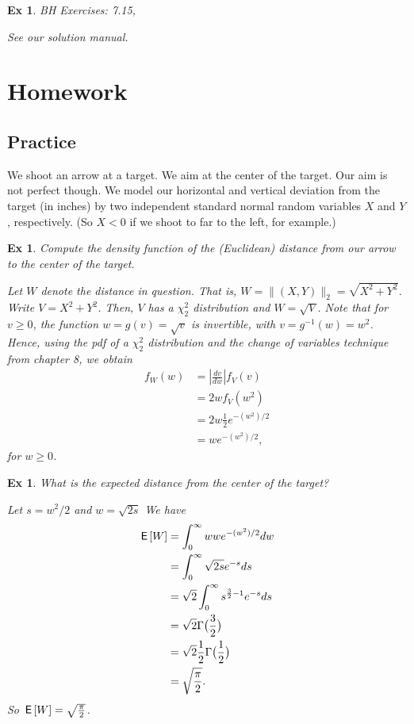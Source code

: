 \documentclass[a4paper,11pt]{article}
\newtheorem{exercise}[theorem]{Ex}
\begin{document}
\begin{exercise}
BH Exercises: 7.15,
\begin{solution}
See our solution manual.
\end{solution}
\end{exercise}


\section{Homework}
\label{sec:homework}

\subsection{Practice}
\label{sec:practice}

We shoot an arrow at a target. We aim at the center of the target. Our aim is not perfect though. We model our horizontal and vertical deviation from the target (in inches) by two independent standard normal random variables $X$ and $Y$, respectively. (So $X<0$ if we shoot to far to the left, for example.)

\begin{exercise}
Compute the density function of the (Euclidean) distance from our arrow to the center of the target. %
\begin{solution}
Let $W$ denote the distance in question. That is, $W = \| (X,Y) \|_2 = \sqrt{X^2 + Y^2}$. Write $V = X^2 + Y^2$. Then, $V$ has a $\chi^2_2$ distribution and $W = \sqrt{V}$. Note that for $v \geq 0$, the function $w = g(v) = \sqrt{v}$ is invertible, with $v = g^{-1}(w) = w^2$. Hence, using the pdf of a $\chi^2_2$ distribution and the change of variables technique from chapter 8, we obtain
\begin{align}
    f_W(w) &=  |\frac{dv}{dw}| f_V(v) \\
    &= 2w f_V(w^2) \\
    &= 2w \frac{1}{2} e^{-(w^2)/2} \\
    &= w e^{-(w^2)/2},
\end{align}
for $w \geq 0$.
\end{solution}
\end{exercise}


\begin{exercise}
What is the expected distance from the center of the target?
\begin{solution}

Let $s = w^2/2$ and $w = \sqrt{2s}$
We have
\begin{align}
    \,\mathsf{E}\left[W\right] &= \int_{0}^{\infty} w w e^{-(w^2)/2} dw \\
    &= \int_{0}^{\infty} \sqrt{2s} e^{-s} ds \\
    &= \sqrt{2}\int_{0}^{\infty} s^{\frac{3}{2}-1} e^{-s} ds \\
    &= \sqrt{2}\Gamma\big(\frac{3}{2}\big) \\
    &= \sqrt{2} \frac{1}{2}\Gamma\big(\frac{1}{2}\big) \\
    &= \sqrt{\frac{\pi}{2}}.
\end{align}
So $\,\mathsf{E}\left[W\right] = \sqrt{\frac{\pi}{2}}$.
\end{solution}
\end{exercise}
\end{document}
